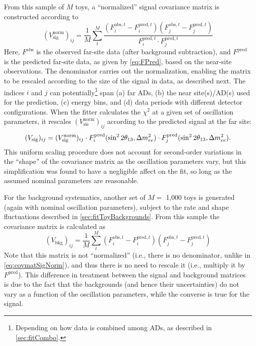 \documentclass[../thesis.tex]{subfiles}
\begin{document}
From this sample of $M$ toys, a ``normalized'' signal covariance matrix is constructed according to
\begin{equation}
  \label{eq:covmatSigNorm}
  (V^{\mathrm{norm}}_{\mathrm{sig}})_{ij} = \frac{1}{M} \sum_t^{M}
  \frac{(F^{\mathrm{obs},t}_i - F^{\mathrm{pred},t}_i)(F^{\mathrm{obs},t}_j - F^{\mathrm{pred},t}_j)}%
       {F^{\mathrm{pred},t}_i \cdot F^{\mathrm{pred},t}_j}
\end{equation}
Here, $F^{\mathrm{obs}}$ is the observed far-site data (after background subtraction), and $F^{\mathrm{pred}}$ is the predicted far-site data, as given by \autoref{eq:FPred}, based on the near-site observations. The denominator carries out the normalization, enabling the matrix to be rescaled according to the size of the signal in data, as described next. The indices $i$ and $j$ can potentially\footnote{Depending on how data is combined among ADs, as described in \autoref{sec:fitCombo}.} span (a) far ADs, (b) the near site(s)/AD(s) used for the prediction, (c) energy bins, and (d) data periods with different detector configurations. When the fitter calculates the $\chi^2$ at a given set of oscillation parameters, it rescales $(V^{\mathrm{norm}}_{\mathrm{sis}})_{ij}$ according to the predicted signal at the far site:
\begin{equation}
  (V_{\mathrm{sig}})_{ij} = (V^{\mathrm{norm}}_{\mathrm{sig}})_{ij} \cdot F^{\mathrm{pred}}_i(\sin^2 2\theta_{13}, \Delta m^2_{ee})
  \cdot F^{\mathrm{pred}}_j(\sin^2 2\theta_{13}, \Delta m^2_{ee}).
\end{equation}
This uniform scaling procedure does not account for second-order variations in the ``shape'' of the covariance matrix as the oscillation parameters vary, but this simplification was found to have a negligible affect on the fit, so long as the assumed nominal parameters are reasonable.

For the background systematics, another set of $M = $ 1,000 toys is generated (again with nominal oscillation parameters), subject to the rate and shape fluctuations described in \autoref{sec:fitToyBackgrounds}. From this sample the covariance matrix is calculated as
\begin{equation}
  \label{eq:covmatBG}
  (V_{\mathrm{bkg}})_{ij} = \frac{1}{M} \sum_t^{M}
  (F^{\mathrm{obs},t}_i - F^{\mathrm{pred},t}_i)(F^{\mathrm{obs},t}_j - F^{\mathrm{pred},t}_j)
\end{equation}
Note that this matrix is not ``normalized'' (i.e., there is no denominator, unlike in \autoref{eq:covmatSigNorm}), and thus there is no need to rescale it (i.e., multiply it by $F^{\mathrm{pred}}$). This difference in treatment between the signal and background matrices is due to the fact that the backgrounds (and hence their uncertainties) do not vary as a function of the oscillation parameters, while the converse is true for the signal.
\end{document}
